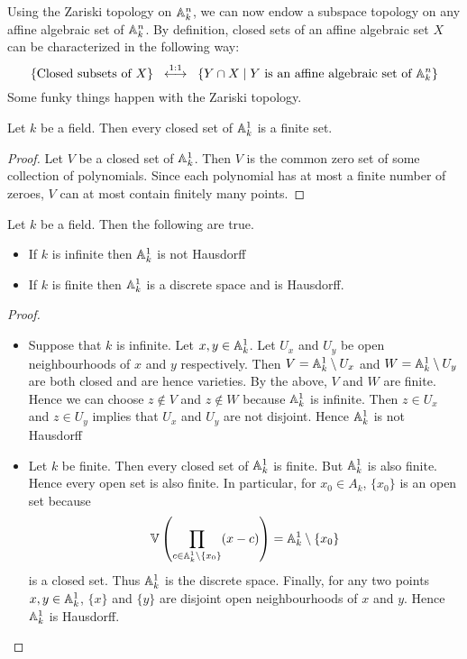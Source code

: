 \documentclass[a4paper]{article}
\begin{document}
Using the Zariski topology on $\mathbb{A}_k^n$, we can now endow a subspace topology on any affine algebraic set of $\mathbb{A}_k^n$. By definition, closed sets of an affine algebraic set $X$ can be characterized in the following way: $$\left\{\text{Closed subsets of }X\right\}\;\;\overset{1:1}{\longleftrightarrow}\;\;\left\{Y\cap X\;|\; Y\text{ is an affine algebraic set of }\mathbb{A}_k^n\right\}$$ Some funky things happen with the Zariski topology. 

\begin{lmm}{}{} Let $k$ be a field. Then every closed set of $\mathbb{A}_k^1$ is a finite set. \tcbline
\begin{proof}
Let $V$ be a closed set of $\mathbb{A}_k^1$. Then $V$ is the common zero set of some collection of polynomials. Since each polynomial has at most a finite number of zeroes, $V$ can at most contain finitely many points. 
\end{proof}
\end{lmm}

\begin{eg}{}{} Let $k$ be a field. Then the following are true. 
\begin{itemize}
\item If $k$ is infinite then $\mathbb{A}_k^1$ is not Hausdorff
\item If $k$ is finite then $\mathbb{A}_k^1$ is a discrete space and is Hausdorff. 
\end{itemize} \tcbline
\begin{proof}~\\
\begin{itemize}
\item Suppose that $k$ is infinite. Let $x,y\in\mathbb{A}_k^1$. Let $U_x$ and $U_y$ be open neighbourhoods of $x$ and $y$ respectively. Then $V=\mathbb{A}_k^1\setminus U_x$ and $W=\mathbb{A}_k^1\setminus U_y$ are both closed and are hence varieties. By the above, $V$ and $W$ are finite. Hence we can choose $z\notin V$ and $z\notin W$ because $\mathbb{A}_k^1$ is infinite. Then $z\in U_x$ and $z\in U_y$ implies that $U_x$ and $U_y$ are not disjoint. Hence $\mathbb{A}_k^1$ is not Hausdorff
\item Let $k$ be finite. Then every closed set of $\mathbb{A}_k^1$ is finite. But $\mathbb{A}_k^1$ is also finite. Hence every open set is also finite. In particular, for $x_0\in A_k$, $\{x_0\}$ is an open set because $$\mathbb{V}\left(\prod_{c\in\mathbb{A}_k^1\setminus\{x_0\}}(x-c)\right)=\mathbb{A}_k^1\setminus\{x_0\}$$ is a closed set. Thus $\mathbb{A}_k^1$ is the discrete space. Finally, for any two points $x,y\in\mathbb{A}_k^1$, $\{x\}$ and $\{y\}$ are disjoint open neighbourhoods of $x$ and $y$. Hence $\mathbb{A}_k^1$ is Hausdorff. 
\end{itemize}
\end{proof}
\end{eg}
\end{document}
